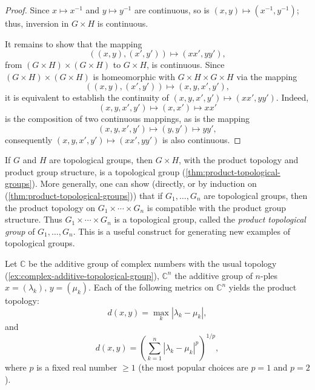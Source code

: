 \begin{proof}

    Since \( x \mapsto x^{-1} \) and \( y \mapsto y^{-1} \) are continuous, so is \( (x, y) \mapsto (x^{-1}, y^{-1}) \);
    thus, inversion in \( G \times H \) is continuous.

    It remains to show that the mapping
    \[
        ((x, y), (x', y')) \mapsto (xx', yy'),
    \]
    from \( (G \times H) \times (G \times H) \) to \( G \times H \), is continuous.
    Since \( (G \times H) \times (G \times H) \) is homeomorphic with \( G \times H \times G \times H \) via the mapping
    \[
        ((x, y), (x', y')) \mapsto (x, y, x', y'),
    \]
    it is equivalent to establish the continuity of \( (x, y, x', y') \mapsto (xx', yy') \). Indeed,
    \[
        (x, y, x', y') \mapsto (x, x') \mapsto xx'
    \]
    is the composition of two continuous mappings, as is the mapping
    \[
        (x, y, x', y') \mapsto (y, y') \mapsto yy',
    \]
    consequently \( (x, y, x', y') \mapsto (xx', yy') \) is also continuous.
\end{proof}


\begin{remark}
    If \( G \) and \( H \) are topological groups, then \( G \times H \), with the product topology and product group structure, is a topological group (\ref{thm:product-topological-groups}).
    More generally, one can show (directly, or by induction on (\ref{thm:product-topological-groups})) that if \( G_1, \ldots, G_n \) are topological groups,
    then the product topology on \( G_1 \times \cdots \times G_n \) is compatible with the product group structure.
    Thus \( G_1 \times \cdots \times G_n \) is a topological group, called the \emph{product topological group} of \( G_1, \ldots, G_n \).
    This is a useful construct for generating new examples of topological groups.
\end{remark}


\begin{example}
    Let \( \mathbb{C} \) be the additive group of complex numbers with the usual topology (\ref{ex:complex-additive-topological-group}),
    \( \mathbb{C}^n \) the additive group of \( n \)-ples \( x = (\lambda_k),\, y = (\mu_k) \).
    Each of the following metrics on \( \mathbb{C}^n \) yields the product topology:
    \[
        d(x, y) = \max_k |\lambda_k - \mu_k|,
    \]
    and
    \[
        d(x, y) = \left( \sum_{k=1}^{n} |\lambda_k - \mu_k|^p \right)^{1/p},
    \]
    where \( p \) is a fixed real number \( \geq 1 \) (the most popular choices are \( p = 1 \) and \( p = 2 \)).
\end{example}

